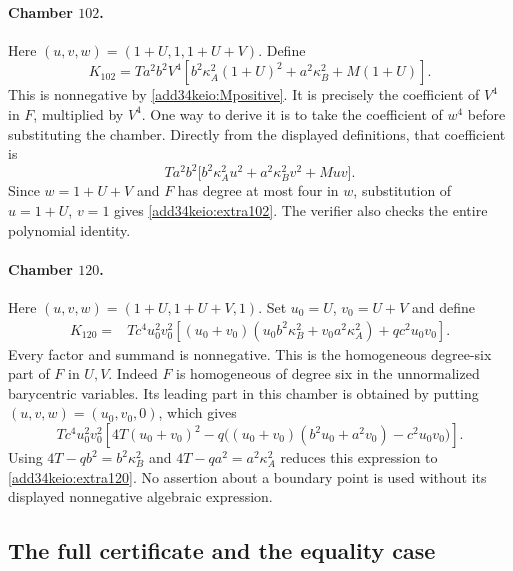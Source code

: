 \documentclass[11pt,a4paper]{article}
\numberwithin{equation}{section}
\theoremstyle{definition}
\theoremstyle{remark}
\begin{document}
\paragraph{Chamber $102$.}
Here $(u,v,w)=(1+U,1,1+U+V)$. Define
\begin{equation}\label{add34keio:extra102}
 K_{102}=Ta^2b^2 V^4
 \left[b^2\kappa_A^2(1+U)^2+a^2\kappa_B^2+M(1+U)\right].
\end{equation}
This is nonnegative by \eqref{add34keio:Mpositive}. It is precisely the
coefficient of $V^4$ in $F$, multiplied by $V^4$.
One way to derive it is to take the coefficient of $w^4$ before
substituting the chamber. Directly from the displayed definitions,
that coefficient is
\[
 Ta^2b^2\bigl[b^2\kappa_A^2u^2+a^2\kappa_B^2v^2+Muv\bigr].
\]
Since $w=1+U+V$ and $F$ has degree at most four in $w$,
substitution of $u=1+U$, $v=1$ gives \eqref{add34keio:extra102}.
The verifier also checks the entire polynomial identity.

\paragraph{Chamber $120$.}
Here $(u,v,w)=(1+U,1+U+V,1)$. Set $u_0=U$, $v_0=U+V$ and define
\begin{equation}\label{add34keio:extra120}
\begin{split}
 K_{120}={}&Tc^4u_0^2v_0^2
 \left[(u_0+v_0)
       \left(u_0b^2\kappa_B^2+v_0a^2\kappa_A^2\right)
       +qc^2u_0v_0\right].
\end{split}
\end{equation}
Every factor and summand is nonnegative. This is the homogeneous
degree-six part of $F$ in $U,V$. Indeed $F$ is homogeneous of degree
six in the unnormalized barycentric variables. Its leading part in
this chamber is obtained by putting $(u,v,w)=(u_0,v_0,0)$, which gives
\[
 Tc^4u_0^2v_0^2\left[4T(u_0+v_0)^2
 -q\bigl((u_0+v_0)(b^2u_0+a^2v_0)-c^2u_0v_0\bigr)\right].
\]
Using $4T-qb^2=b^2\kappa_B^2$ and
$4T-qa^2=a^2\kappa_A^2$ reduces this expression to
\eqref{add34keio:extra120}. No assertion about a boundary point is used without
its displayed nonnegative algebraic expression.

\subsection{The full certificate and the equality case}
\end{document}
